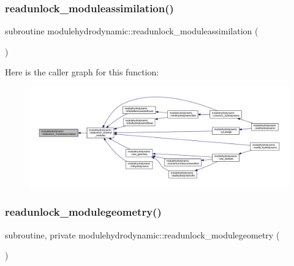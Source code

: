 \subsubsection{\texorpdfstring{readunlock\+\_\+moduleassimilation()}{readunlock\_moduleassimilation()}}
{\footnotesize\ttfamily subroutine modulehydrodynamic\+::readunlock\+\_\+moduleassimilation (\begin{DoxyParamCaption}{ }\end{DoxyParamCaption})\hspace{0.3cm}{\ttfamily [private]}}

Here is the caller graph for this function\+:\nopagebreak
\begin{figure}[H]
\begin{center}
\leavevmode
\includegraphics[width=350pt]{namespacemodulehydrodynamic_a758de1858d333cb26621ded54ff8be04_icgraph}
\end{center}
\end{figure}
\mbox{\label{namespacemodulehydrodynamic_a987bae5d3ffa9f3fc96e0dfa2ead01ad}} 
\subsubsection{\texorpdfstring{readunlock\+\_\+modulegeometry()}{readunlock\_modulegeometry()}}
{\footnotesize\ttfamily subroutine, private modulehydrodynamic\+::readunlock\+\_\+modulegeometry (\begin{DoxyParamCaption}{ }\end{DoxyParamCaption})\hspace{0.3cm}{\ttfamily [private]}}

